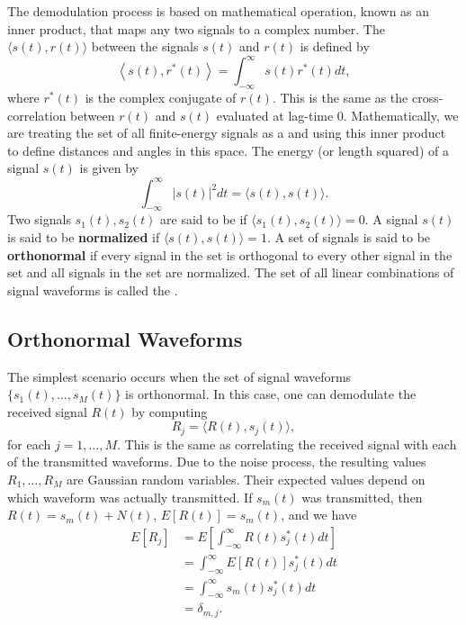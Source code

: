 The demodulation process is based on mathematical operation, known as an inner product, that maps any two signals to a complex number.
The  $\langle s(t) , r(t) \rangle$ between the signals $s(t)$ and $r(t)$ is defined by
\begin{equation*}
\left\langle s (t), r^* (t) \right\rangle
= \int_{-\infty}^{\infty} s(t) r^* (t) dt,
\end{equation*}
where $r^* (t)$ is the complex conjugate of $r(t)$.
This is the same as the cross-correlation between $r(t)$ and $s(t)$ evaluated at lag-time 0.
Mathematically, we are treating the set of all finite-energy signals as a  and using this inner product to define distances and angles in this space.
The energy (or length squared) of a signal $s(t)$ is given by
\[ \int_{-\infty}^{\infty} \left| s(t) \right|^2 dt = \langle s(t),s(t) \rangle. \]
Two signals $s_1 (t),s_2 (t)$ are said to be  if $\langle s_1(t),s_2 (t)\rangle = 0$.
A signal $s(t)$ is said to be \textbf{normalized} if $\langle s(t),s(t) \rangle = 1$.
A set of signals is said to be \textbf{orthonormal} if every signal in the set is orthogonal to every other signal in the set and all signals in the set are normalized.
The set of all linear combinations of signal waveforms is called the .

\subsection{Orthonormal Waveforms}
The simplest scenario occurs when the set of signal waveforms $\{ s_1 (t), \ldots , s_M (t) \}$ is orthonormal.
In this case, one can demodulate the received signal $R(t)$ by computing
\[ R_j = \langle R(t), s_j (t) \rangle, \]
for each $j=1,\ldots,M$.
This is the same as correlating the received signal with each of the transmitted waveforms.
Due to the noise process, the resulting values $R_1 , \ldots, R_M$ are Gaussian random variables.
Their expected values depend on which waveform was actually transmitted.
If $s_m (t)$ was transmitted, then $R(t) = s_m(t) + N(t)$, $E[R(t)] = s_m(t)$, and we have
\begin{align*}
E \left[R_j \right]
&= E \left[ \int_{-\infty}^{\infty} R(t) s_j^* (t) dt \right] \\
&= \int_{-\infty}^{\infty} E \left[ R(t) \right] s_j^* (t) dt \\
&= \int_{-\infty}^{\infty} s_m (t) s_j^* (t) dt \\
&= \delta_{m,j}.
\end{align*}

